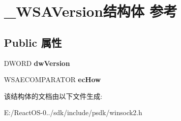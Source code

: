 \hypertarget{struct___w_s_a_version}{}\section{\+\_\+\+W\+S\+A\+Version结构体 参考}
\label{struct___w_s_a_version}
\subsection*{Public 属性}
\begin{DoxyCompactItemize}
\item 
\mbox{\label{struct___w_s_a_version_a75eaec28038dc21c16180205504e6686}} 
D\+W\+O\+RD {\bfseries dw\+Version}
\item 
\mbox{\label{struct___w_s_a_version_a10de6e9679afe940bb982872f989aad1}} 
W\+S\+A\+E\+C\+O\+M\+P\+A\+R\+A\+T\+OR {\bfseries ec\+How}
\end{DoxyCompactItemize}


该结构体的文档由以下文件生成\+:\begin{DoxyCompactItemize}
\item 
E\+:/\+React\+O\+S-\/0../sdk/include/psdk/winsock2.\+h\end{DoxyCompactItemize}
